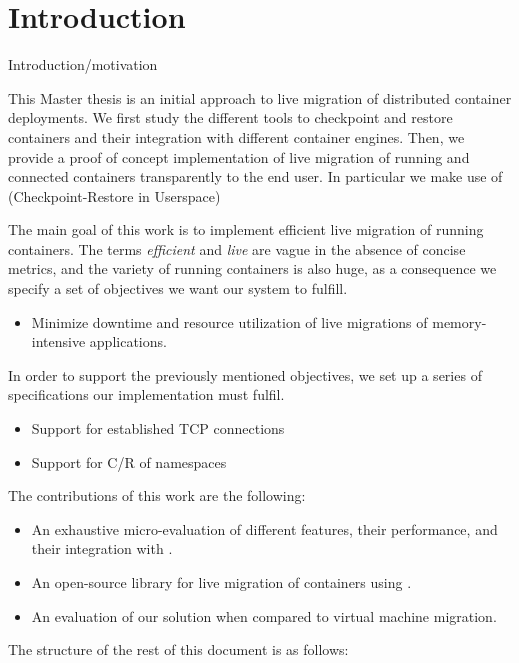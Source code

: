 \chapter{Introduction} \label{chap:introduction}


Introduction/motivation

This Master thesis is an initial approach to live migration of distributed container deployments.
We first study the different tools to checkpoint and restore containers and their integration with different container engines.
Then, we provide a proof of concept implementation of live migration of running and connected containers transparently to the end user.
In particular we make use of \criu (Checkpoint-Restore in Userspace) 

The main goal of this work is to implement efficient live migration of running containers.
The terms \textit{efficient} and \textit{live} are vague in the absence of concise metrics, and the variety of running containers is also huge, as a consequence we specify a set of objectives we want our system to fulfill.
\begin{itemize}
    \item Minimize downtime and resource utilization of live migrations of memory-intensive applications.
\end{itemize}

In order to support the previously mentioned objectives, we set up a series of specifications our implementation must fulfil.
\begin{itemize}
    \item Support for established TCP connections
    \item Support for C/R of namespaces
\end{itemize}

The contributions of this work are the following:
\begin{itemize}
    \item An exhaustive micro-evaluation of different \criu features, their performance, and their integration with \runc.
    \item An open-source library for live migration of \runc containers using \criu.
    \item An evaluation of our solution when compared to virtual machine migration.
\end{itemize}

The structure of the rest of this document is as follows:
